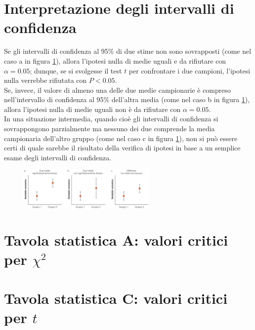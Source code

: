 \documentclass[10pt, draft]{book}
\begin{document}
\section{Interpretazione degli intervalli di confidenza}

Se gli intervalli di confidenza al 95\% di due stime non sono sovrapposti (come nel caso a in figura \ref{fig12.6-1}), allora l'ipotesi nulla di medie uguali e da rifiutare con $\alpha = 0.05$; dunque, se si svolgesse il test $t$ per confrontare i due campioni, l'ipotesi nulla verrebbe rifiutata con $P < 0.05$.
\\
Se, invece, il valore di almeno una delle due medie campionarie è compreso nell'intervallo di confidenza al 95\% dell'altra media (come nel caso b in figura \ref{fig12.6-1}), allora l'ipotesi nulla di medie uguali non è da rifiutare con $\alpha = 0.05$.
\\
In una situazione intermedia, quando cioè gli intervalli di confidenza si sovrappongono parzialmente ma nessuno dei due comprende la media campionaria dell'altro gruppo (come nel caso c in figura \ref{fig12.6-1}), non si può essere certi di quale sarebbe il risultato della verifica di ipotesi in base a un semplice esame degli intervalli di confidenza.
\begin{figure}[H]\label{fig12.6-1}
    \centering
    \includegraphics[width=0.6\textwidth]{fig12.6-1}
    \caption{\small{}}
\end{figure}


\section{Tavola statistica A: valori critici per \texorpdfstring{$\chi^2$}{Lg}}

\section{Tavola statistica C: valori critici per \texorpdfstring{$t$}{Lg}}
\end{document}
